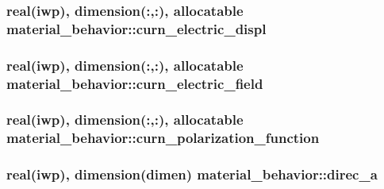 \subsubsection[{curn\+\_\+electric\+\_\+displ}]{\setlength{\rightskip}{0pt plus 5cm}real(iwp), dimension(\+:,\+:), allocatable material\+\_\+behavior\+::curn\+\_\+electric\+\_\+displ}\label{classmaterial__behavior_abd37805114cdc4a1f45c3b92bdda99cd}
\hypertarget{classmaterial__behavior_a35226defc9e95a951812134717beecf5}{}
\subsubsection[{curn\+\_\+electric\+\_\+field}]{\setlength{\rightskip}{0pt plus 5cm}real(iwp), dimension(\+:,\+:), allocatable material\+\_\+behavior\+::curn\+\_\+electric\+\_\+field}\label{classmaterial__behavior_a35226defc9e95a951812134717beecf5}
\hypertarget{classmaterial__behavior_a8da5847f13b86fec4992e70561abade6}{}
\subsubsection[{curn\+\_\+polarization\+\_\+function}]{\setlength{\rightskip}{0pt plus 5cm}real(iwp), dimension(\+:,\+:), allocatable material\+\_\+behavior\+::curn\+\_\+polarization\+\_\+function}\label{classmaterial__behavior_a8da5847f13b86fec4992e70561abade6}
\hypertarget{classmaterial__behavior_a82e31798dc8d8eaa46a7fb9a11b95285}{}
\subsubsection[{direc\+\_\+a}]{\setlength{\rightskip}{0pt plus 5cm}real(iwp), dimension(dimen) material\+\_\+behavior\+::direc\+\_\+a}\label{classmaterial__behavior_a82e31798dc8d8eaa46a7fb9a11b95285}
\hypertarget{classmaterial__behavior_ab3e2b38e175ef5341037213c49d1d38e}{}
